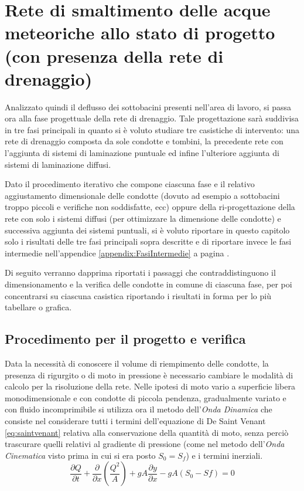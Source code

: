 \chapter{Rete di smaltimento delle acque meteoriche allo stato di progetto (con presenza
della rete di drenaggio)} \label{cap:ProgettoRete}
Analizzato quindi il deflusso dei sottobacini presenti nell'area di lavoro, si passa ora alla fase progettuale della rete di drenaggio. 
Tale progettazione sarà suddivisa in tre fasi principali in quanto si è voluto studiare tre casistiche di intervento: una rete di drenaggio composta da sole condotte e tombini, la precedente rete con l'aggiunta di sistemi di laminazione puntuale ed infine l'ulteriore aggiunta di sistemi di laminazione diffusi.

Dato il procedimento iterativo che compone ciascuna fase e il relativo aggiustamento dimensionale delle condotte (dovuto ad esempio  a sottobacini troppo piccoli e verifiche non soddisfatte, ecc) oppure della ri-progettazione della rete con solo i sistemi diffusi (per ottimizzare la dimensione delle condotte) e successiva aggiunta dei sistemi puntuali, si è voluto riportare in questo capitolo solo i risultati delle tre fasi principali sopra descritte e di  riportare invece le fasi intermedie nell'appendice \ref{appendix:FasiIntermedie} a pagina \pageref{appendix:FasiIntermedie}. 

Di seguito verranno dapprima riportati i passaggi che contraddistinguono il dimensionamento e la verifica delle condotte in comune di ciascuna fase, per poi concentrarsi su ciascuna casistica riportando i risultati in forma per lo più tabellare o grafica.

\section{Procedimento per il progetto e verifica}
Data la necessità di conoscere il volume di riempimento delle condotte, la presenza di rigurgito o di moto in pressione è necessario cambiare le modalità di calcolo per la risoluzione della rete.
Nelle ipotesi di moto vario a superficie libera monodimensionale e con condotte di piccola pendenza, gradualmente variato e con fluido incomprimibile si utilizza ora il metodo dell'\emph{Onda Dinamica} che consiste nel considerare tutti i termini dell'equazione di De Saint Venant \ref{eq:saintvenant} relativa alla conservazione della quantità di moto, senza perciò trascurare quelli relativi al gradiente di pressione (come nel metodo dell'\emph{Onda Cinematica} visto prima in cui si era posto $S_0 = S_f$) e i termini inerziali. 
\begin{equation}
    \label{eq:saintvenant}
    \frac{\partial Q}{\partial t} + \frac{\partial}{\partial x} \left( \frac{Q^2}{A} \right) + g A \frac{\partial y}{\partial x} - g A (S_0 - Sf) = 0
 \end{equation}

